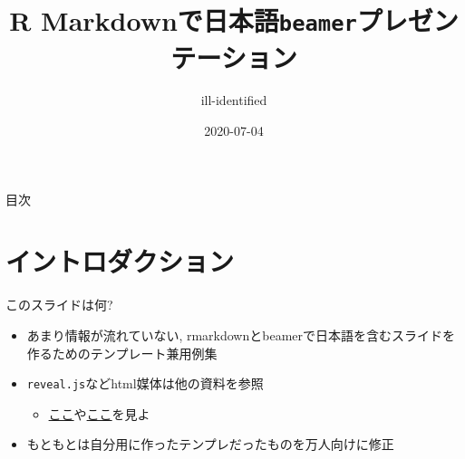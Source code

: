 \documentclass[
  12pt,
  ignorenonframetext,
]{beamer}
\title{R Markdownで日本語\texttt{beamer}プレゼンテーション}
\author{ill-identified}
\date{2020-07-04}
\providecommand{\tightlist}{%
  \setlength{\itemsep}{0pt}\setlength{\parskip}{0pt}}
\begin{document}
\frame{\titlepage}

\begin{frame}
  \tableofcontents[hideallsubsections]
\end{frame}
\begin{frame}{目次}
\protect\hypertarget{ux76eeux6b21}{}

\tableofcontents[hideallsubsections]

\end{frame}

\hypertarget{ux30a4ux30f3ux30c8ux30edux30c0ux30afux30b7ux30e7ux30f3}{%
\section{イントロダクション}\label{ux30a4ux30f3ux30c8ux30edux30c0ux30afux30b7ux30e7ux30f3}}

\begin{frame}[fragile]{このスライドは何?}
\protect\hypertarget{ux3053ux306eux30b9ux30e9ux30a4ux30c9ux306fux4f55}{}

\begin{itemize}
\tightlist
\item
  あまり情報が流れていない,
  rmarkdownとbeamerで日本語を含むスライドを作るためのテンプレート兼用例集
\item
  \texttt{reveal.js}などhtml媒体は他の資料を参照

  \begin{itemize}
  \tightlist
  \item
    \href{https://kazutan.github.io/SappoRoR6/rmd_slide.html\#/}{ここ}や\href{https://kazutan.github.io/fukuokaR11/intro_rmarkdown_d.html}{ここ}を見よ
  \end{itemize}
\item
  もともとは自分用に作ったテンプレだったものを万人向けに修正
\end{itemize}

\end{frame}
\end{document}
